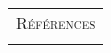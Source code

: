 \documentclass[10pt]{beamer}
\theoremstyle{plain}
\begin{document}
\begin{notes}

  \begin{center}
    \begin{tabular}{c}
      \\
      \Huge{\textsc{Références}}\\
      \\
    \end{tabular}
  \end{center}

  \bigskip

  \nocite{Green2017}

  \nocite{Schmidt1976}

  \printbibliography

\end{notes}
\end{document}

